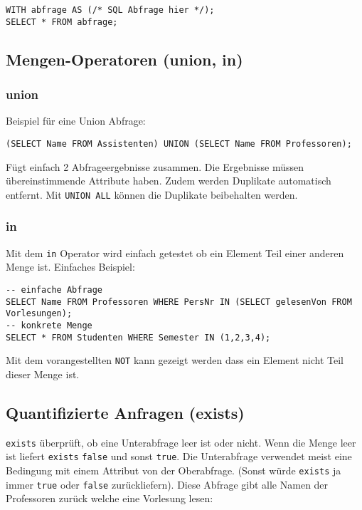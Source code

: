 \begin{lstlisting}[caption={with Operator},label=lst:with]
WITH abfrage AS (/* SQL Abfrage hier */);
SELECT * FROM abfrage;
\end{lstlisting}

\subsection{Mengen-Operatoren (union, in)}
\label{sec:mengen_operatoren}

\subsubsection{union}
Beispiel für eine Union Abfrage:

\begin{lstlisting}[caption={Union Abfrage Beispiel},label=lst:union_bsp]
(SELECT Name FROM Assistenten) UNION (SELECT Name FROM Professoren);
\end{lstlisting}

Fügt einfach 2 Abfrageergebnisse zusammen. Die Ergebnisse müssen übereinstimmende Attribute haben. Zudem werden Duplikate automatisch entfernt. Mit \texttt{UNION ALL} können die Duplikate beibehalten werden.

\subsubsection{in}
\label{sec:in_operator}

Mit dem \texttt{in} Operator wird einfach getestet ob ein Element Teil einer anderen Menge ist. Einfaches Beispiel:

\begin{lstlisting}[caption={Beispiel in Operator},label=lst:in_bsp]
-- einfache Abfrage
SELECT Name FROM Professoren WHERE PersNr IN (SELECT gelesenVon FROM Vorlesungen);
-- konkrete Menge
SELECT * FROM Studenten WHERE Semester IN (1,2,3,4);
\end{lstlisting}

Mit dem vorangestellten \texttt{NOT} kann gezeigt werden dass ein Element nicht Teil dieser Menge ist.

\subsection{Quantifizierte Anfragen (exists)}

\texttt{exists} überprüft, ob eine Unterabfrage leer ist oder nicht. Wenn die Menge leer ist liefert \texttt{exists} \texttt{false} und sonst \texttt{true}. Die Unterabfrage verwendet meist eine Bedingung mit einem Attribut von der Oberabfrage. (Sonst würde \texttt{exists} ja immer \texttt{true} oder \texttt{false} zurückliefern). Diese Abfrage gibt alle Namen der Professoren zurück welche eine Vorlesung lesen:

